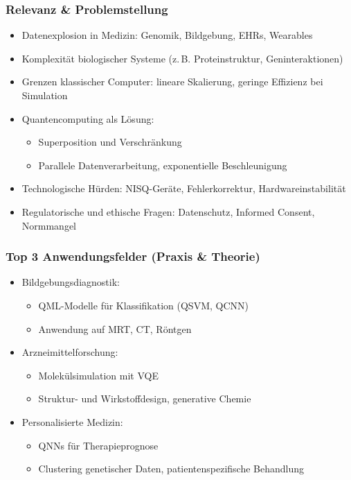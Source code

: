 \subsubsection*{Relevanz \& Problemstellung}
\begin{itemize}
    \item Datenexplosion in Medizin: Genomik, Bildgebung, EHRs, Wearables
    \item Komplexität biologischer Systeme (z.\,B. Proteinstruktur, Geninteraktionen)
    \item Grenzen klassischer Computer: lineare Skalierung, geringe Effizienz bei Simulation
    \item Quantencomputing als Lösung:
    \begin{itemize}
        \item Superposition und Verschränkung
        \item Parallele Datenverarbeitung, exponentielle Beschleunigung
    \end{itemize}
    \item Technologische Hürden: NISQ-Geräte, Fehlerkorrektur, Hardwareinstabilität
    \item Regulatorische und ethische Fragen: Datenschutz, Informed Consent, Normmangel
\end{itemize}

\subsubsection*{Top 3 Anwendungsfelder (Praxis \& Theorie)}
\begin{itemize}
    \item Bildgebungsdiagnostik:
    \begin{itemize}
        \item QML-Modelle für Klassifikation (QSVM, QCNN)
        \item Anwendung auf MRT, CT, Röntgen
    \end{itemize}
    \item Arzneimittelforschung:
    \begin{itemize}
        \item Molekülsimulation mit VQE
        \item Struktur- und Wirkstoffdesign, generative Chemie
    \end{itemize}
    \item Personalisierte Medizin:
    \begin{itemize}
        \item QNNs für Therapieprognose
        \item Clustering genetischer Daten, patientenspezifische Behandlung
    \end{itemize}
\end{itemize}

